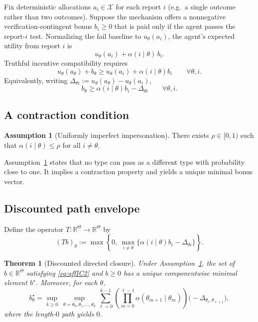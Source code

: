 \documentclass[final,3p,times]{elsarticle}
\theoremstyle{plain}
\newtheorem{theorem}{Theorem}
\theoremstyle{definition}
\newtheorem{assumption}{Assumption}
\newcommand{\R}{\mathbb{R}}
\newcommand{\1}{\mathbbm{1}}
\newcommand{\ThetaSet}{\Theta}
\newcommand{\cX}{\mathcal{X}}
\begin{document}
Fix deterministic allocations $a_i\in\cX$ for each report $i$ (e.g.\ a single outcome rather than two outcomes). Suppose the mechanism offers a nonnegative verification-contingent bonus $b_i\ge 0$ that is paid only if the agent passes the report-$i$ test. Normalizing the fail baseline to $u_\theta(a_i)$, the agent's expected utility from report $i$ is
\[
u_\theta(a_i) + \alpha(i\mid\theta)\,b_i.
\]
Truthful incentive compatibility requires
\begin{equation}\label{eq:affIC}
u_\theta(a_\theta)+b_\theta \ge u_\theta(a_i)+\alpha(i\mid\theta)b_i
\qquad \forall \theta,i.
\end{equation}
Equivalently, writing $\Delta_{\theta i}:=u_\theta(a_\theta)-u_\theta(a_i)$,
\begin{equation}\label{eq:affIC2}
b_\theta \ge \alpha(i\mid\theta)b_i - \Delta_{\theta i}\qquad \forall \theta,i.
\end{equation}

\subsection{A contraction condition}

\begin{assumption}[Uniformly imperfect impersonation]\label{ass:rho}
There exists $\rho\in[0,1)$ such that $\alpha(i\mid\theta)\le \rho$ for all $i\neq \theta$.
\end{assumption}

Assumption~\ref{ass:rho} states that no type can pass as a different type with probability close to one. It implies a contraction property and yields a unique minimal bonus vector.

\subsection{Discounted path envelope}

Define the operator $T:\R^{\ThetaSet}\to\R^{\ThetaSet}$ by
\begin{equation}\label{eq:Bell}
(Tb)_\theta := \max\left\{0,\ \max_{i\neq\theta}\{\alpha(i\mid\theta)b_i-\Delta_{\theta i}\}\right\}.
\end{equation}

\begin{theorem}[Discounted directed closure]\label{thm:discounted}
Under Assumption~\ref{ass:rho}, the set of $b\in\R^{\ThetaSet}$ satisfying \eqref{eq:affIC2} and $b\ge 0$ has a unique componentwise minimal element $b^\star$. Moreover, for each $\theta$,
\begin{equation}\label{eq:DP}
b^\star_\theta
=\sup_{k\ge 0}\ \sup_{\theta=\theta_0,\theta_1,\dots,\theta_k}
\sum_{\ell=0}^{k-1}\left(\prod_{m=0}^{\ell-1}\alpha(\theta_{m+1}\mid\theta_m)\right)\big(-\Delta_{\theta_\ell,\theta_{\ell+1}}\big),
\end{equation}
where the length-$0$ path yields $0$.
\end{theorem}
\end{document}
